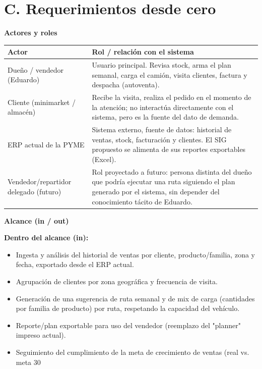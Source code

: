 \documentclass[10pt,a4paper]{article}
\begin{document}
\section*{C. Requerimientos desde cero}

\textbf{Actores y roles}

\begin{center}

\renewcommand{\arraystretch}{1.3}
\setlength{\tabcolsep}{6pt}

\begin{tabular}{|p{4cm}|p{10cm}|}
\hline

\textbf{Actor} & \textbf{Rol / relación con el sistema} \\ \hline

Dueño / vendedor (Eduardo) &
Usuario principal. Revisa stock, arma el plan semanal, carga el camión, visita clientes, factura y despacha (autoventa). \\ \hline

Cliente (minimarket / almacén) &
Recibe la visita, realiza el pedido en el momento de la atención; no interactúa directamente con el sistema, pero es la fuente del dato de demanda. \\ \hline

ERP actual de la PYME &
Sistema externo, fuente de datos: historial de ventas, stock, facturación y clientes. El SIG propuesto se alimenta de sus reportes exportables (Excel). \\ \hline

Vendedor/repartidor delegado (futuro) &
Rol proyectado a futuro: persona distinta del dueño que podría ejecutar una ruta siguiendo el plan generado por el sistema, sin depender del conocimiento tácito de Eduardo. \\ \hline

\end{tabular}

\end{center}

\textbf{Alcance (in / out)}

\vspace{0.3cm}

\textbf{Dentro del alcance (in):}
\begin{itemize}[leftmargin=1.2cm]
    \item Ingesta y análisis del historial de ventas por cliente, producto/familia, zona y fecha, exportado desde el ERP actual.
    \item Agrupación de clientes por zona geográfica y frecuencia de visita.
    \item Generación de una sugerencia de ruta semanal y de mix de carga (cantidades por familia de producto) por ruta, respetando la capacidad del vehículo.
    \item Reporte/plan exportable para uso del vendedor (reemplazo del "planner" impreso actual).
    \item Seguimiento del cumplimiento de la meta de crecimiento de ventas (real vs. meta 30%
\end{itemize}
\end{document}
